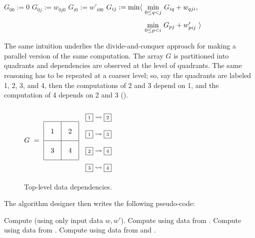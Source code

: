 \begin{algorithm}
\renewcommand\arraystretch{1.3}
\begin{algorithmic}
  \STATE $G_{00} := 0$
    $G_{0j} := w_{0j0}$  
    \STATE $G_{i0} := w'_{i00}$
      \STATE $G_{ij} :=
        \begin{array}[t]{@{}l@{~}l} 
          \min\langle & \underset{0\leq q<j}\min ~ G_{iq} + w_{qji}, \\
                      & \underset{0\leq p<i}\min ~ G_{pj} + w'_{pij}~\rangle 
        \end{array}$
    \ENDFOR
  \ENDFOR
\end{algorithmic}
\end{algorithm}

The same intuition underlies the divide-and-conquer approach for making
a parallel version of the same computation. The array $G$ is partitioned into
quadrants and dependencies are observed at the level of quadrants. The same reasoning
has to be repeated at a coarser level;
so, say the quadrants are labeled 1, 2, 3, and 4, then the computations of 2 and 3 depend on 1,
and the computation of 4 depends on 2 and 3 ().

\newcommand\qbox[1]{\fbox{\scriptsize#1}}

\begin{figure}[b]
\quad
$\renewcommand\arraystretch{2}G ~=~
 \begin{array}{|@{\quad}c@{\quad}|@{\quad}c@{\quad}|} \hline 1 & 2 \\[1mm] \hline 3 & 4 \\[1mm] \hline\end{array}$
\qquad
$\begin{array}{l}\qbox1 \rightsquigarrow \qbox2 \\ 
\qbox1 \rightsquigarrow \qbox3 \\ \qbox2\rightsquigarrow \qbox4 \\ \qbox3 \rightsquigarrow \qbox4\end{array}$
\caption{\label{intro:quadrants}
  Top-level data dependencies.}
\end{figure}

\medskip
The algorithm designer then writes the following pseudo-code:

\begin{algorithmic}[1]
  \STATE Compute \qbox1 (using only input data $w,w'$).
  \STATE Compute \qbox2 using data from \qbox1.
  \STATE Compute \qbox3 using data from \qbox1.
  \STATE Compute \qbox4 using data from \qbox2 and \qbox3.
\end{algorithmic}

